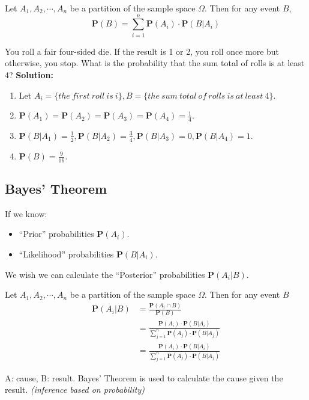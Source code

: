 \begin{theorem}
    Let $A_1, A_2, \cdots, A_n$ be a partition of the sample space $\varOmega$. Then for any event $B$,
    \begin{equation}
        \mathbf{P}(B) = \sum_{i=1}^{n} \mathbf{P}(A_i) \cdot \mathbf{P}(B | A_i)
    \end{equation}
\end{theorem}
\begin{example}
    You roll a fair four-sided die. If the result is 1 or 2, you roll once more but otherwise, you stop. What is the probability that the sum total of rolls is at least 4?
    \textbf{Solution:}
    \begin{enumerate}
        \item Let $A_i = \{the~first~roll~is~i\}, B = \{the~sum~total~of~rolls~is~at~least~4\}$.
        \item $\mathbf{P}(A_1) = \mathbf{P}(A_2) = \mathbf{P}(A_3) = \mathbf{P}(A_4) = \frac{1}{4}$.
        \item $\mathbf{P}(B | A_1) = \frac{1}{2}, \mathbf{P}(B | A_2) = \frac{3}{4}, \mathbf{P}(B | A_3) = 0, \mathbf{P}(B | A_4) = 1$.
        \item $\mathbf{P}(B) = \frac{9}{16}$.
    \end{enumerate}
\end{example}


\subsection{Bayes' Theorem}
If we know:
\begin{itemize}
    \item ``Prior'' probabilities $\mathbf{P}(A_i)$.
    \item ``Likelihood'' probabilities $\mathbf{P}(B | A_i)$.
\end{itemize}
We wish we can calculate the ``Posterior'' probabilities $\mathbf{P}(A_i | B)$. 

\begin{theorem}
    Let $A_1, A_2, \cdots, A_n$ be a partition of the sample space $\varOmega$. Then for any event $B$
    \begin{equation}
    \begin{aligned}
        \mathbf{P}(A_i | B) &= \frac{\mathbf{P}(A_i \cap B)}{\mathbf{P}(B)} \\
        &= \frac{\mathbf{P}(A_i) \cdot \mathbf{P}(B | A_i)}{\sum_{j=1}^{n} \mathbf{P}(A_j) \cdot \mathbf{P}(B | A_j)} \\
        &= \frac{\mathbf{P}(A_i) \cdot \mathbf{P}(B | A_i)}{\sum_{j=1}^{n} \mathbf{P}(A_j) \cdot \mathbf{P}(B | A_j)}
    \end{aligned}
    \end{equation}
\end{theorem}

A: cause, B: result. Bayes' Theorem is used to calculate the cause given the result. \textit{(inference based on probability)}
